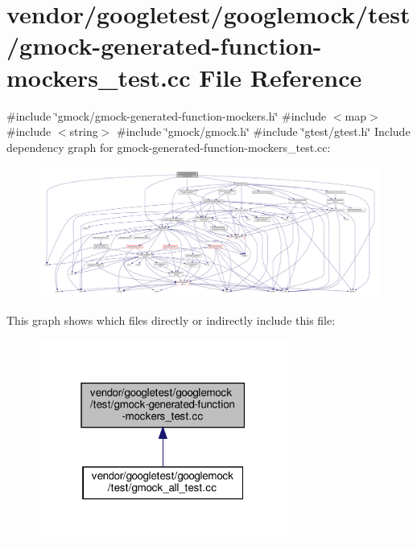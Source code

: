 \hypertarget{gmock-generated-function-mockers__test_8cc}{}\section{vendor/googletest/googlemock/test/gmock-\/generated-\/function-\/mockers\+\_\+test.cc File Reference}
\label{gmock-generated-function-mockers__test_8cc}
{\ttfamily \#include \char`\"{}gmock/gmock-\/generated-\/function-\/mockers.\+h\char`\"{}}\newline
{\ttfamily \#include $<$map$>$}\newline
{\ttfamily \#include $<$string$>$}\newline
{\ttfamily \#include \char`\"{}gmock/gmock.\+h\char`\"{}}\newline
{\ttfamily \#include \char`\"{}gtest/gtest.\+h\char`\"{}}\newline
Include dependency graph for gmock-\/generated-\/function-\/mockers\+\_\+test.cc\+:
\nopagebreak
\begin{figure}[H]
\begin{center}
\leavevmode
\includegraphics[width=350pt]{gmock-generated-function-mockers__test_8cc__incl}
\end{center}
\end{figure}
This graph shows which files directly or indirectly include this file\+:
\nopagebreak
\begin{figure}[H]
\begin{center}
\leavevmode
\includegraphics[width=232pt]{gmock-generated-function-mockers__test_8cc__dep__incl}
\end{center}
\end{figure}
